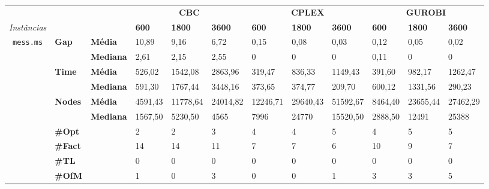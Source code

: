 
	\begin{footnotesize}	
	\caption{}
	\label{cflp:tab:9}
	\begin{tabular}{c@{\hskip 0.2cm}l@{\hskip 0.1cm}l|lll|lll|lll}
	& & & \multicolumn{3}{c}{\textbf{CBC}} & \multicolumn{3}{c}{\textbf{CPLEX}} & \multicolumn{3}{c}{\textbf{GUROBI}} 	\\\textit{Instâncias} & & & \textbf{600} & \textbf{1800} & \textbf{3600} & \textbf{600} & \textbf{1800} & \textbf{3600} & \textbf{600} & \textbf{1800} & \textbf{3600} \\
\hline
\multirow{7}{*}{\texttt{mess.ms}} & \multirow{2}{*}{\textbf{Gap}} & \textbf{Média} & 10,89 & 9,16 & 6,72 & 0,15 & 0,08 & 0,03 & 0,12 & 0,05 & 0,02 \\
 & & \textbf{Mediana} & 2,61 & 2,15 & 2,55 & 0 & 0 & 0 & 0,11 & 0 & 0 \\
\cline{2-12}
 & \multirow{2}{*}{\textbf{Time}} & \textbf{Média} & 526,02 & 1542,08 & 2863,96 & 319,47 & 836,33 & 1149,43 & 391,60 & 982,17 & 1262,47 \\
 & & \textbf{Mediana} & 591,30 & 1767,44 & 3448,16 & 373,65 & 374,77 & 209,70 & 600,12 & 1331,56 & 290,23 \\
\cline{2-12}
 & \multirow{2}{*}{\textbf{Nodes}} & \textbf{Média} & 4591,43 & 11778,64 & 24014,82 & 12246,71 & 29640,43 & 51592,67 & 8464,40 & 23655,44 & 27462,29 \\
 & & \textbf{Mediana} & 1567,50 & 5230,50 & 4565 & 7996 & 24770 & 15520,50 & 2888,50 & 12491 & 25388 \\
\cline{2-12}
 & \textbf{\#Opt} & & 2 & 2 & 3 & 4 & 4 & 5 & 4 & 5 & 5 \\
 & \textbf{\#Fact} & & 14 & 14 & 11 & 7 & 7 & 6 & 10 & 9 & 7 \\
 & \textbf{\#TL} & & 0 & 0 & 0 & 0 & 0 & 0 & 0 & 0 & 0 \\
 & \textbf{\#OfM} & & 1 & 0 & 3 & 0 & 0 & 1 & 3 & 3 & 5 \\
	\end{tabular}
	\end{footnotesize}

